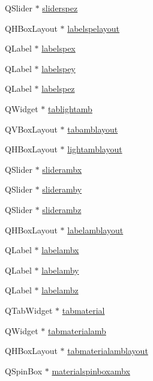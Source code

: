 \begin{DoxyCompactItemize}
\item 
Q\+Slider $\ast$ \hyperlink{class_mondock_a496a2a2470c9c96599cd491608544bf6}{sliderspez}
\item 
Q\+H\+Box\+Layout $\ast$ \hyperlink{class_mondock_ad034a6a1d416711fd87e9594a33d9ae4}{labelspelayout}
\item 
Q\+Label $\ast$ \hyperlink{class_mondock_a9dcd6eacb52a58adddd1f0118dc7fc66}{labelspex}
\item 
Q\+Label $\ast$ \hyperlink{class_mondock_a51f3374b36482300513cfaa0d9e7cb44}{labelspey}
\item 
Q\+Label $\ast$ \hyperlink{class_mondock_af00a5126b8b2d537b5a46064b4d26d76}{labelspez}
\item 
Q\+Widget $\ast$ \hyperlink{class_mondock_a9033d2049c8fcdc628ef06ea8cb192ca}{tablightamb}
\item 
Q\+V\+Box\+Layout $\ast$ \hyperlink{class_mondock_a73f30ee1b770ddf08cdb854136ab4e51}{tabamblayout}
\item 
Q\+H\+Box\+Layout $\ast$ \hyperlink{class_mondock_ada46a57b4e681dc6f9420ae74f46fefc}{lightamblayout}
\item 
Q\+Slider $\ast$ \hyperlink{class_mondock_a51c280e3a1dae1f368e9028069afb424}{sliderambx}
\item 
Q\+Slider $\ast$ \hyperlink{class_mondock_ac6a5fbe64fd9a0567ae84e9ec5244fbd}{slideramby}
\item 
Q\+Slider $\ast$ \hyperlink{class_mondock_aa90503d09eeebd2f51e15a416c6424c7}{sliderambz}
\item 
Q\+H\+Box\+Layout $\ast$ \hyperlink{class_mondock_a8726f8f74256a666684740d03747ad5a}{labelamblayout}
\item 
Q\+Label $\ast$ \hyperlink{class_mondock_af77614bc15448c7488db1b12a03162f5}{labelambx}
\item 
Q\+Label $\ast$ \hyperlink{class_mondock_a467e81ae77fc44ddd9785214c64ae443}{labelamby}
\item 
Q\+Label $\ast$ \hyperlink{class_mondock_a59965e3362191562ca427aaafbffb67f}{labelambz}
\item 
Q\+Tab\+Widget $\ast$ \hyperlink{class_mondock_a85429c5714bc04dc5866983a9659f723}{tabmaterial}
\item 
Q\+Widget $\ast$ \hyperlink{class_mondock_a5b0d6245de8e0e70d7552ad035295793}{tabmaterialamb}
\item 
Q\+H\+Box\+Layout $\ast$ \hyperlink{class_mondock_a768206ca1e41a57f687e6bbbdaca3a9a}{tabmaterialamblayout}
\item 
Q\+Spin\+Box $\ast$ \hyperlink{class_mondock_a4efb6643d3bea5ac601770ed2e3b3290}{materialspinboxambx}

\end{DoxyCompactItemize}
